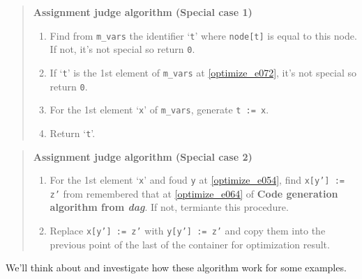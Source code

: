 \begin{quote}
{\bf Assignment judge algorithm (Special case 1) }
\begin{enumerate}
\item \label{optimize_e072}
      Find from {\tt{m\_vars}} the identifier `{\tt{t}}' where
      {\tt{node[t]}} is equal to this node. If not, it's not special so
      return {\tt{0}}.
\item If `{\tt{t}}' is the 1st element of {\tt{m\_vars}} at
      \ref{optimize_e072}, it's not special so return {\tt{0}}.

\item For the 1st element `{\tt{x}}' of {\tt{m\_vars}},
      generate {\tt{t := x}}.

\item Return `{\tt{t}}'.
\end{enumerate}
\end{quote}

\begin{quote}
{\bf Assignment judge algorithm (Special case 2) }
\begin{enumerate}
\item \label{optimize_e107}
      For the 1st element `{\tt{x}}' and foud {\tt{y}}
      at \ref{optimize_e054},
      find {\tt{x[y'] := z'}} from remembered that at \ref{optimize_e064}
      of {\bf Code generation algorithm from {\em dag}}.
      If not, termiante this procedure.

\item Replace {\tt{x[y'] := z'}} with {\tt{y[y'] := z'}} 
      and copy them into the previous point of the last of
      the container for optimization result.
\end{enumerate}
\end{quote}

We'll think about and investigate how these algorithm work for some examples.

